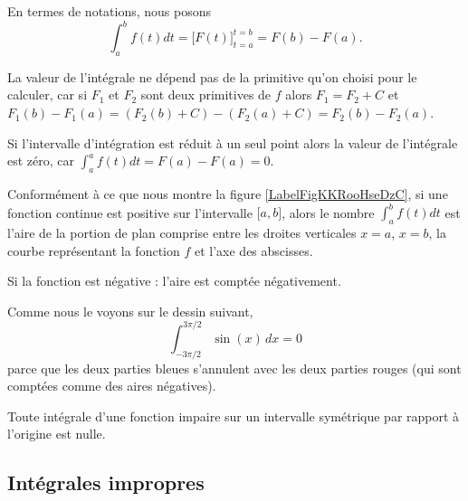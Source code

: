 En termes de notations, nous posons
\begin{equation}\label{Thfondcalc}
    \int_a^bf(t)dt=\Big[ F(t) \Big]_{t=a}^{t=b}=F(b)-F(a).
\end{equation}

\begin{remark}
  La valeur de l'intégrale ne dépend pas de la primitive qu'on choisi pour le calculer, car si $F_1$ et $F_2$ sont deux primitives de $f$ alors $F_1 = F_2 + C$ et $F_1(b)-F_1(a) = (F_2(b) + C)-(F_2(a)+C) = F_2(b)-F_2(a)$.
\end{remark}

\begin{remark}
  Si l'intervalle d'intégration est réduit à un seul point alors la valeur de l'intégrale est zéro, car $ \int_a^af(t)dt=F(a)-F(a) =0$.
\end{remark}

\begin{remark}
    Conformément à ce que nous montre la figure \ref{LabelFigKKRooHseDzC}, si une fonction continue est positive sur l'intervalle \( \mathopen[ a , b \mathclose]\), alors le nombre \( \int_a^bf(t)dt\) est l'aire de la portion de plan comprise entre les droites verticales \( x=a\), \( x=b\), la courbe représentant la fonction \( f\) et l'axe des abscisses.

    Si la fonction est négative : l'aire est comptée négativement.
\end{remark}

\begin{example} 
    Comme nous le voyons sur le dessin suivant,
    \begin{equation}
        \int_{-3\pi/2}^{3\pi/2}\sin(x)\,dx=0
    \end{equation}
    parce que les deux parties bleues s'annulent avec les deux parties rouges (qui sont comptées comme des aires négatives).
    \begin{center}
       
    \end{center}
\end{example}

\begin{remark}
  Toute intégrale d'une fonction impaire sur un intervalle symétrique par rapport à l'origine est nulle. 
\end{remark}

\subsection{Intégrales impropres}
\label{SecGAVooBOQddU}

